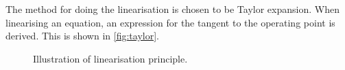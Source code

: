 The method for doing the linearisation is chosen to be Taylor expansion.
When linearising an equation, an expression for the tangent to the operating point is derived. 
This is shown in \autoref{fig:taylor}. %
\begin{figure}[H]
\centering

\caption{Illustration of linearisation principle.}
\label{fig:taylor}
\end{figure}

